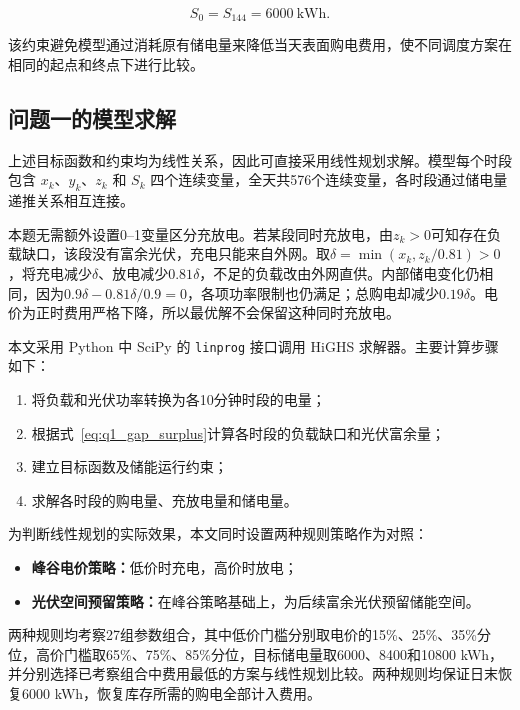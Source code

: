 \begin{equation}
S_0=S_{144}=6000\ \mathrm{kWh}.
\label{eq:q1_terminal_constraint}
\end{equation}

该约束避免模型通过消耗原有储电量来降低当天表面购电费用，使不同调度方案在相同的起点和终点下进行比较。

\subsection{问题一的模型求解}

上述目标函数和约束均为线性关系，因此可直接采用线性规划求解。模型每个时段包含 \(x_k\)、\(y_k\)、\(z_k\) 和 \(S_k\) 四个连续变量，全天共576个连续变量，各时段通过储电量递推关系相互连接。

本题无需额外设置0--1变量区分充放电。若某段同时充放电，由$z_k>0$可知存在负载缺口，该段没有富余光伏，充电只能来自外网。取$\delta=\min(x_k,z_k/0.81)>0$，将充电减少$\delta$、放电减少$0.81\delta$，不足的负载改由外网直供。内部储电变化仍相同，因为$0.9\delta-0.81\delta/0.9=0$，各项功率限制也仍满足；总购电却减少$0.19\delta$。电价为正时费用严格下降，所以最优解不会保留这种同时充放电。

本文采用 Python 中 SciPy 的 \texttt{linprog} 接口调用 HiGHS 求解器。主要计算步骤如下：

\begin{enumerate}
    \item 将负载和光伏功率转换为各10分钟时段的电量；
    \item 根据式~\eqref{eq:q1_gap_surplus}计算各时段的负载缺口和光伏富余量；
    \item 建立目标函数及储能运行约束；
    \item 求解各时段的购电量、充放电量和储电量。
\end{enumerate}

为判断线性规划的实际效果，本文同时设置两种规则策略作为对照：

\begin{itemize}
    \item \textbf{峰谷电价策略：}低价时充电，高价时放电；
    \item \textbf{光伏空间预留策略：}在峰谷策略基础上，为后续富余光伏预留储能空间。
\end{itemize}

两种规则均考察27组参数组合，其中低价门槛分别取电价的15\%、25\%、35\%分位，高价门槛取65\%、75\%、85\%分位，目标储电量取6000、8400和10800 kWh，并分别选择已考察组合中费用最低的方案与线性规划比较。两种规则均保证日末恢复6000 kWh，恢复库存所需的购电全部计入费用。

